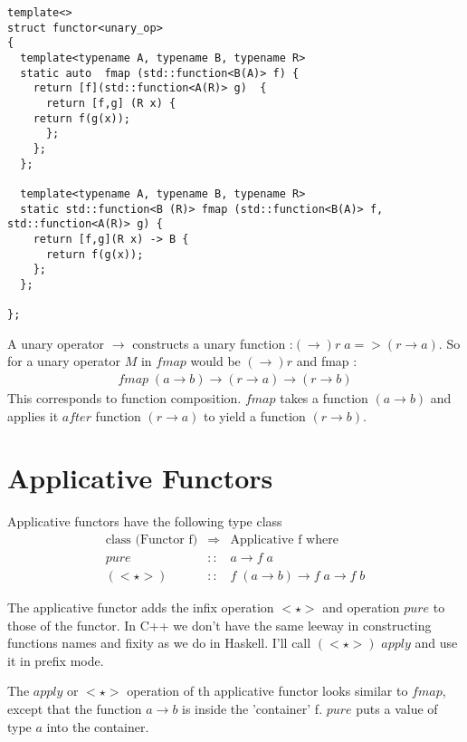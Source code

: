 \documentclass[12pt,fleqn]{article}
\begin{document}
\begin{lstlisting}
template<>
struct functor<unary_op>
{
  template<typename A, typename B, typename R>
  static auto  fmap (std::function<B(A)> f) {  
    return [f](std::function<A(R)> g)  {
      return [f,g] (R x) {
	return f(g(x));
      };
    };
  };

  template<typename A, typename B, typename R>
  static std::function<B (R)> fmap (std::function<B(A)> f, std::function<A(R)> g) {  
    return [f,g](R x) -> B {
      return f(g(x));
    };
  };

};
\end{lstlisting}

A unary operator $\rightarrow$ constructs a unary function :$(\rightarrow) r\;a => (r \rightarrow a)$.
So for a unary operator $M$ in $fmap$  would be $(\rightarrow) r$ and fmap :
\begin{eqnarray*}
fmap \; (a \rightarrow b) \rightarrow (r \rightarrow a) \rightarrow (r \rightarrow b)
\end{eqnarray*}
This corresponds to function composition.
$fmap$ takes a function $(a\rightarrow b)$ and applies it $after$ function $(r \rightarrow a)$ to yield a function $(r \rightarrow b)$.




\section*{Applicative Functors}

Applicative functors have the following type class 
\begin{eqnarray*}
\mbox{class (Functor f)} &\Rightarrow& \mbox{Applicative f where} \\
pure  &::& a \rightarrow f\;a \\
(<\star>) &::& f \; ( a \rightarrow b) \rightarrow f \; a \rightarrow f\;b
\end{eqnarray*}

The applicative functor adds the infix operation $<\star>$ and operation $pure$ to those of the functor.
In C++ we don't have the same leeway in  constructing functions names and fixity as we do in Haskell.
I'll call $(<\star>)$ $apply$ and use it in prefix mode.

The $apply$ or $<\star>$ operation of th applicative functor looks similar to $fmap$, except that the function $a \rightarrow b$ is inside the 'container' f.
$pure$ puts a value of type $a$ into the container.
\end{document}
